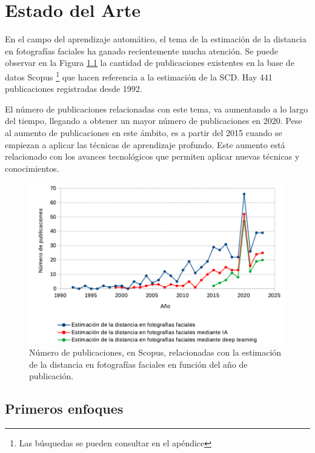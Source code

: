 \chapter{Estado del Arte}
\thispagestyle{empty}

En el campo del aprendizaje automático, el tema de la estimación de la distancia en fotografías faciales ha ganado recientemente mucha atención. Se puede observar en la Figura \ref{fig16} la cantidad de publicaciones existentes en la base de datos Scopus \footnote{Las búsquedas se pueden consultar en el apéndice} que hacen referencia a la estimación de la SCD. Hay 441 publicaciones registradas desde 1992.

El número de publicaciones relacionadas con este tema, va aumentando a lo largo del tiempo, llegando a obtener un mayor número de publicaciones en 2020. Pese al aumento de publicaciones en este ámbito, es a partir del 2015 cuando se empiezan a aplicar las técnicas de aprendizaje profundo. Este aumento está relacionado con los avances tecnológicos que permiten aplicar nuevas técnicas y conocimientos. 

\begin{figure}[h]
	\centering
	\includegraphics[scale=0.8]{imagenes/cap3/grafica_scopus5.png}
	\caption[Número de publicaciones sobre la estimación de la SCD.]{Número de publicaciones, en Scopus, relacionadas con la estimación de la distancia en fotografías faciales en función del año de publicación.}
	\label{fig16}
\end{figure}

\section{Primeros enfoques}

